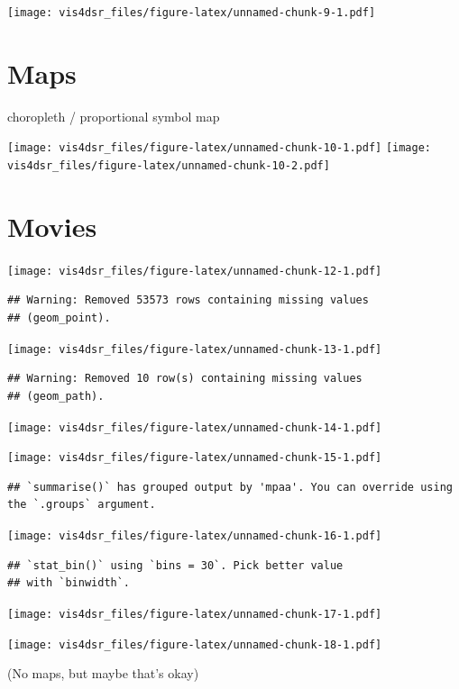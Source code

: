 \documentclass[
]{krantz}
\begin{document}
\texttt{[image: vis4dsr\_files/figure-latex/unnamed-chunk-9-1.pdf]}

\hypertarget{maps}{%
\section{Maps}\label{maps}}

choropleth / proportional symbol map

\texttt{[image: vis4dsr\_files/figure-latex/unnamed-chunk-10-1.pdf]} \texttt{[image: vis4dsr\_files/figure-latex/unnamed-chunk-10-2.pdf]}

\hypertarget{movies}{%
\section{Movies}\label{movies}}

\texttt{[image: vis4dsr\_files/figure-latex/unnamed-chunk-12-1.pdf]}

\begin{verbatim}
## Warning: Removed 53573 rows containing missing values
## (geom_point).
\end{verbatim}

\texttt{[image: vis4dsr\_files/figure-latex/unnamed-chunk-13-1.pdf]}

\begin{verbatim}
## Warning: Removed 10 row(s) containing missing values
## (geom_path).
\end{verbatim}

\texttt{[image: vis4dsr\_files/figure-latex/unnamed-chunk-14-1.pdf]}

\texttt{[image: vis4dsr\_files/figure-latex/unnamed-chunk-15-1.pdf]}

\begin{verbatim}
## `summarise()` has grouped output by 'mpaa'. You can override using the `.groups` argument.
\end{verbatim}

\texttt{[image: vis4dsr\_files/figure-latex/unnamed-chunk-16-1.pdf]}

\begin{verbatim}
## `stat_bin()` using `bins = 30`. Pick better value
## with `binwidth`.
\end{verbatim}

\texttt{[image: vis4dsr\_files/figure-latex/unnamed-chunk-17-1.pdf]}

\texttt{[image: vis4dsr\_files/figure-latex/unnamed-chunk-18-1.pdf]}

(No maps, but maybe that's okay)
\end{document}
